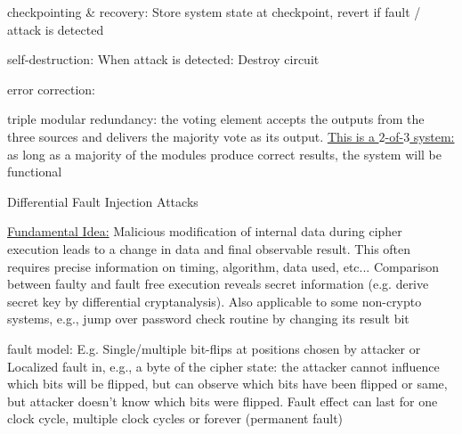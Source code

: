 \documentclass[landscape, a4paper]{article}
\begin{document}
\begin{minipage}[t]{0.2\linewidth}
\begin{betterlist}
\begin{betterlist}
\begin{betterlist}
\begin{betterlist}
					\item \alert{checkpointing \& recovery:} Store system state at checkpoint, revert if fault / attack is detected

					\item \alert{self-destruction:} When attack is detected: Destroy circuit
				\end{betterlist}

			\end{betterlist}
			\item \alert{error correction:}
			\begin{betterlist}
				\item \alert{triple modular redundancy:} the voting element accepts the outputs from the three sources and delivers the \alert{majority vote as its output}. \underline{This is a $2$-of-$3$ system:} as long as a majority of the modules produce correct results, the system will be functional
			\end{betterlist}
		\end{betterlist}
	\end{betterlist}
	\begin{betterlist}
		\item \alert{Differential Fault Injection Attacks}
		\begin{betterlist}
			\item \underline{Fundamental Idea:} Malicious modification of internal data during cipher execution leads to a change in data and final observable result. This often requires precise information on timing, algorithm, data used, etc... Comparison between faulty and fault free execution reveals secret information (e.g. derive secret key by differential cryptanalysis). Also applicable to some non-crypto systems, e.g., jump over password check routine by changing its result bit
			\item \alert{fault model:} E.g. Single/multiple bit-flips at positions chosen by attacker or Localized fault in, e.g., a byte of the cipher state: the attacker cannot influence which bits will be flipped, but can observe which bits have been flipped or same, but attacker doesn’t know which bits were flipped. Fault effect can last for one clock cycle, multiple clock cycles or forever (permanent fault)

\end{betterlist}
\end{betterlist}
\end{minipage}
\end{document}
